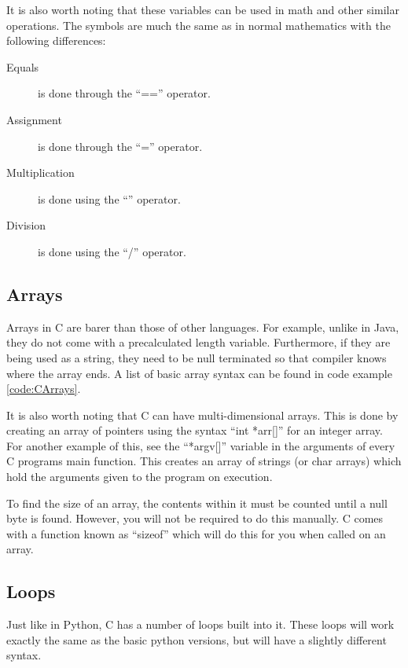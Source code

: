 \documentclass[a4paper,11pt]{report}
\begin{document}
			It is also worth noting that these variables can be used in math and other similar operations. 
			The symbols are much the same as in normal mathematics with the following differences:
			\begin{description}
				\item[Equals] is done through the ``=='' operator.
				\item[Assignment] is done through the ``='' operator.
				\item[Multiplication] is done using the ``\*'' operator.
				\item[Division] is done using the ``/'' operator. 
			\end{description}

		\subsection{Arrays}
			Arrays in C are barer than those of other languages. 
			For example, unlike in Java, they do not come with a precalculated length variable.
			Furthermore, if they are being used as a string, they need to be null terminated so that compiler knows where the array ends. 
			A list of basic array syntax can be found in code example \ref{code:CArrays}.
			\begin{code}
				C}]{./arrays.c}
				\caption{A List of Different Array Syntax}
				\label{code:CArrays}
			\end{code}
			It is also worth noting that C can have multi-dimensional arrays. 
			This is done by creating an array of pointers using the syntax ``int *arr[]'' for an integer array. 
			For another example of this, see the ``*argv[]'' variable in the arguments of every C programs main function. 
			This creates an array of strings (or char arrays) which hold the arguments given to the program on execution. 

			To find the size of an array, the contents within it must be counted until a null byte is found. 
			However, you will not be required to do this manually. 
			C comes with a function known as ``sizeof'' which will do this for you when called on an array. 
		\subsection{Loops}
			Just like in Python, C has a number of loops built into it. 
			These loops will work exactly the same as the basic python versions, but will have a slightly different syntax. 
			
\end{document}
